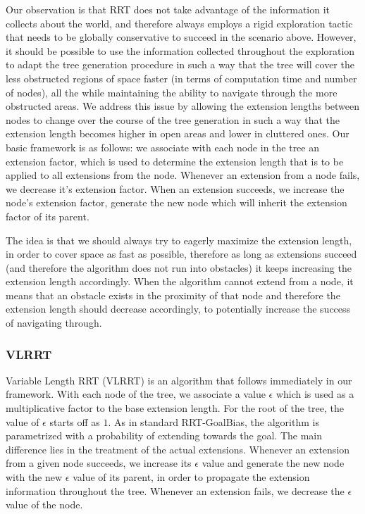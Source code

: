\documentclass[10pt,twoside,twocolumn]{article}
\begin{document}
Our observation is that RRT does not take advantage of the information it collects about the world, and therefore always employs a
rigid exploration tactic that needs to be globally conservative to succeed in the scenario above. However, it should be possible to use
the information collected throughout the exploration to adapt the tree generation procedure in such a way that the tree will cover
the less obstructed regions of space faster (in terms of computation time and number of nodes), all the while maintaining the ability
 to navigate through the more obstructed areas.
%
We address this issue by allowing the extension lengths between nodes to change over the course of the 
tree generation in such a way that the extension length becomes higher in open areas and lower in cluttered ones. Our basic framework
is as follows: we associate with each node in the tree an extension factor, which is used to determine the extension length that is to be
applied to all extensions from the node. Whenever an extension from a node fails, we decrease it's extension factor. 
When an extension succeeds, we increase the node's extension factor, generate the new node which will inherit the extension factor of its parent.

The idea is that we should always try to eagerly maximize the extension length, in order to cover space as fast as possible, therefore
as long as extensions succeed (and therefore the algorithm does not run into obstacles) it keeps increasing the extension length accordingly.
When the algorithm cannot extend from a node, it means that an obstacle exists in the proximity of that node and therefore the extension
length should decrease accordingly, to potentially increase the success of navigating through.

\subsubsection{VLRRT}

Variable Length RRT (VLRRT) is an algorithm that follows immediately in our framework. With each node of the tree,
we associate a value $\epsilon$ which is used as a multiplicative factor to the base extension length. For the root of the
tree, the value of $\epsilon$ starts off as $1$. As in standard RRT-GoalBias, the algorithm is parametrized with a probability of
extending towards the goal. The main difference lies in the treatment of the actual extensions. Whenever an extension from a given
node succeeds, we increase its $\epsilon$ value and generate the new node with the new $\epsilon$ value of its parent, in order to
propagate the extension information throughout the tree. Whenever an extension fails, we decrease the $\epsilon$ value of the node.
\end{document}
